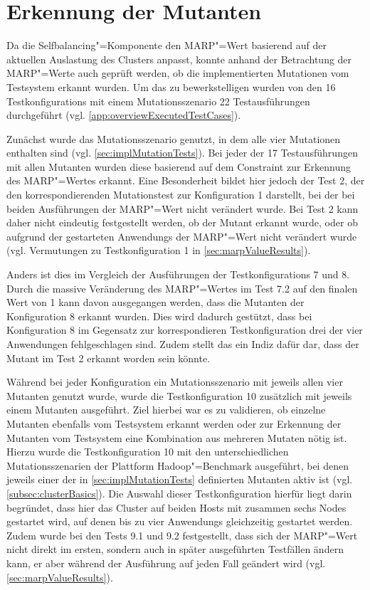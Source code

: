 \section{Erkennung der Mutanten}
\label{sec:killingMutants}

Da die Selfbalancing"=Komponente den \gls{MARP}"=Wert basierend auf der aktuellen Auslastung des Clusters anpasst, konnte anhand der Betrachtung der \gls{MARP}"=Werte auch geprüft werden, ob die implementierten Mutationen vom Testsystem erkannt wurden.
Um das zu bewerkstelligen wurden von den 16 \glspl{Testkonfiguration} mit einem Mutationsszenario 22 Testausführungen durchgeführt (vgl. \cref{app:overviewExecutedTestCases}).

Zunächst wurde das Mutationsszenario genutzt, in dem alle vier Mutationen enthalten sind (vgl. \cref{sec:implMutationTests}).
Bei jeder der 17 Testausführungen mit allen Mutanten wurden diese basierend auf dem Constraint zur Erkennung des \gls{MARP}"=Wertes erkannt.
Eine Besonderheit bildet hier jedoch der \gls{Test} 2, der den korrespondierenden Mutationstest zur Konfiguration 1 darstellt, bei der bei beiden Ausführungen der \gls{MARP}"=Wert nicht verändert wurde.
Bei \gls{Test} 2 kann daher nicht eindeutig festgestellt werden, ob der Mutant erkannt wurde, oder ob aufgrund der gestarteten \glspl{Anwendung} der \gls{MARP}"=Wert nicht verändert wurde (vgl. Vermutungen zu \gls{Testkonfiguration} 1 in \cref{sec:marpValueResults}).

Anders ist dies im Vergleich der Ausführungen der \glspl{Testkonfiguration} 7 und 8.
Durch die massive Veränderung des \gls{MARP}"=Wertes im \gls{Test} 7.2 auf den finalen Wert von 1 kann davon ausgegangen werden, dass die Mutanten der Konfiguration 8 erkannt wurden.
Dies wird dadurch gestützt, dass bei Konfiguration 8 im Gegensatz zur korrespondieren \gls{Testkonfiguration} drei der vier Anwendungen fehlgeschlagen sind.
Zudem stellt das ein Indiz dafür dar, dass der Mutant im Test 2 erkannt worden sein könnte.

Während bei jeder Konfiguration ein Mutationsszenario mit jeweils allen vier Mutanten genutzt wurde, wurde die \gls{Testkonfiguration} 10 zusätzlich mit jeweils einem Mutanten ausgeführt.
Ziel hierbei war es zu validieren, ob einzelne Mutanten ebenfalls vom Testsystem erkannt werden oder zur Erkennung der Mutanten vom Testsystem eine Kombination aus mehreren Mutaten nötig ist.
Hierzu wurde die \gls{Testkonfiguration} 10 mit den unterschiedlichen Mutationsszenarien der Plattform Hadoop"=Benchmark ausgeführt, bei denen jeweils einer der in \cref{sec:implMutationTests} definierten Mutanten aktiv ist (vgl. \cref{subsec:clusterBasics}).
Die Auswahl dieser \gls{Testkonfiguration} hierfür liegt darin begründet, dass hier das Cluster auf beiden Hosts mit zusammen sechs Nodes gestartet wird, auf denen bis zu vier \glspl{Anwendung} gleichzeitig gestartet werden.
Zudem wurde bei den \glspl{Test} 9.1 und 9.2 festgestellt, dass sich der \gls{MARP}"=Wert nicht direkt im ersten, sondern auch in später ausgeführten Testfällen ändern kann, er aber während der Ausführung auf jeden Fall geändert wird (vgl. \cref{sec:marpValueResults}).

